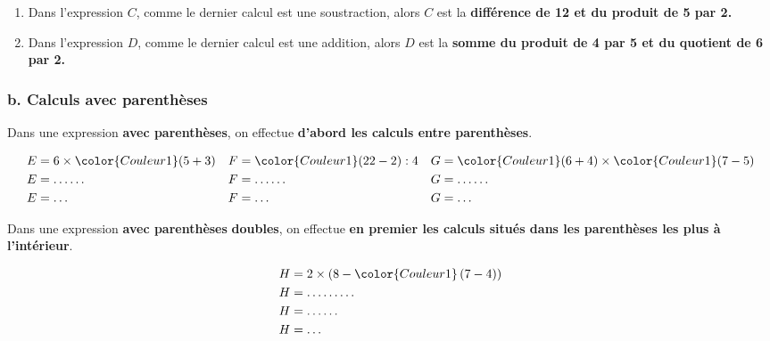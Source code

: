 \begin{Remarque}
\vspace{-0.5cm}
\begin{enumerate}
\item Dans l'expression $C$, comme le dernier calcul est une soustraction, alors $C$ est la \textbf{différence de 12 et du produit de 5 par 2.}
\item Dans l'expression $D$, comme le dernier calcul est une addition, alors $D$ est la \textbf{somme du produit de 4 par 5 et du quotient de 6 par 2.}
\end{enumerate}
\end{Remarque}


 
\subsubsection*{b. Calculs avec parenthèses}

\begin{Règle}
Dans une expression \textbf{avec parenthèses}, on
effectue \textbf{d'abord les calculs entre parenthèses}.
\end{Règle}

\begin{Exemples}
{\normalsize \begin{align*}
E & =6\times{\color{Couleur1}(5+3)} & F & ={\color{Couleur1}(22-2)}:4 & G & ={\color{Couleur1}(6+4)}\times{\color{Couleur1}(7-5)}\\
E & =\ldots\ldots & F & =\ldots\ldots & G & =\ldots\ldots\\
E & =\ldots & F & =\ldots & G & =\ldots
\end{align*}}
\end{Exemples}

\begin{Règle}
Dans une expression \textbf{avec parenthèses} \textbf{doubles},
on effectue \textbf{en premier les calculs situés dans les parenthèses les plus à l'intérieur}.
\end{Règle}

\begin{Exemple} 
{\normalsize
\begin{align*}
H & =2\times\left(8-{\color{Couleur1}\left(7-4\right)}\right)\\
H & =\ldots\ldots\ldots\\
H & =\ldots\ldots\\
H & =\ldots
\end{align*}}
\end{Exemple}


